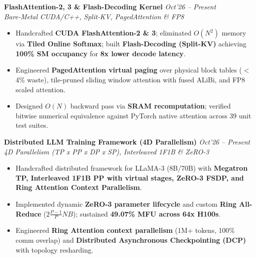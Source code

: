 \documentclass[10pt,a4paper]{article}
\begin{document}
\begin{minipage}[t]{0.488\textwidth}
    \vspace{0.8pt}\vspace{1.2pt}
    \noindent\textbf{FlashAttention-2, 3 \& Flash-Decoding Kernel} \hfill {\footnotesize\textit{Oct'26 -- Present}}\\
    \textit{Bare-Metal CUDA/C++, Split-KV, PagedAttention \& FP8} \href{https://github.com/KishorKumarParoi/cuda-attention-kernel}{\faGithub}
    \begin{itemize}
        \item Handcrafted \textbf{CUDA FlashAttention-2 \& 3}; eliminated $O(N^2)$ memory via \textbf{Tiled Online Softmax}; built \textbf{Flash-Decoding (Split-KV)} achieving \textbf{100\% SM occupancy} for \textbf{8x lower decode latency}.
        \item Engineered \textbf{PagedAttention virtual paging} over physical block tables ($<$4\% waste), tile-pruned sliding window attention with fused ALiBi, and FP8 scaled attention.
        \item Designed $O(N)$ backward pass via \textbf{SRAM recomputation}; verified bitwise numerical equivalence against PyTorch native attention across 39 unit test suites.
    \end{itemize}

    \vspace{0.8pt}\vspace{1.2pt}
    \noindent\textbf{Distributed LLM Training Framework (4D Parallelism)} \hfill {\footnotesize\textit{Oct'26 -- Present}}\\
    \textit{4D Parallelism (TP x PP x DP x SP), Interleaved 1F1B \& ZeRO-3} \href{https://github.com/KishorKumarParoi/distributed-llm-training}{\faGithub}
    \begin{itemize}
        \item Handcrafted distributed framework for LLaMA-3 (8B/70B) with \textbf{Megatron TP, Interleaved 1F1B PP with virtual stages, ZeRO-3 FSDP, and Ring Attention Context Parallelism}.
        \item Implemented dynamic \textbf{ZeRO-3 parameter lifecycle} and custom \textbf{Ring All-Reduce} ($2\frac{P-1}{P}NB$); sustained \textbf{49.07\% MFU across 64x H100s}.
        \item Engineered \textbf{Ring Attention context parallelism} (1M+ tokens, 100\% comm overlap) and \textbf{Distributed Asynchronous Checkpointing (DCP)} with topology resharding.
    \end{itemize}


\end{minipage}
\end{document}
